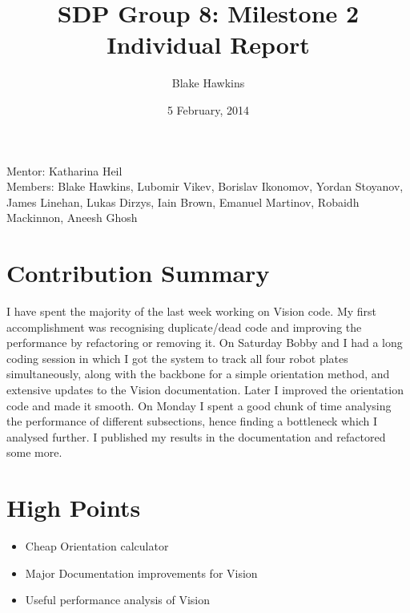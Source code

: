 \documentclass[a4paper,12pt]{article}
\title{SDP Group 8: Milestone 2 Individual Report} %
\author{Blake Hawkins} %
\date{5 February, 2014} %
\begin{document}
\maketitle %

\begin{center}
Mentor: Katharina Heil %
\\
Members: Blake Hawkins, %
Lubomir Vikev,
Borislav Ikonomov,
Yordan Stoyanov,
James Linehan,
Lukas Dirzys,
Iain Brown,
Emanuel Martinov,
Robaidh Mackinnon,
Aneesh Ghosh

\end{center}


\section{Contribution Summary}

I have spent the majority of the last week working on Vision code. My first accomplishment was recognising duplicate/dead code and improving the performance by refactoring or removing it. On Saturday Bobby and I had a long coding session in which I got the system to track all four robot plates simultaneously, along with the backbone for a simple orientation method, and extensive updates to the Vision documentation. Later I improved the orientation code and made it smooth. On Monday I spent a good chunk of time analysing the performance of different subsections, hence finding a bottleneck which I analysed further. I published my results in the documentation and refactored some more.
 

\section{High Points}

\begin{itemize}
\item Cheap Orientation calculator
\item Major Documentation improvements for Vision
\item Useful performance analysis of Vision
\end{itemize}
\end{document}
